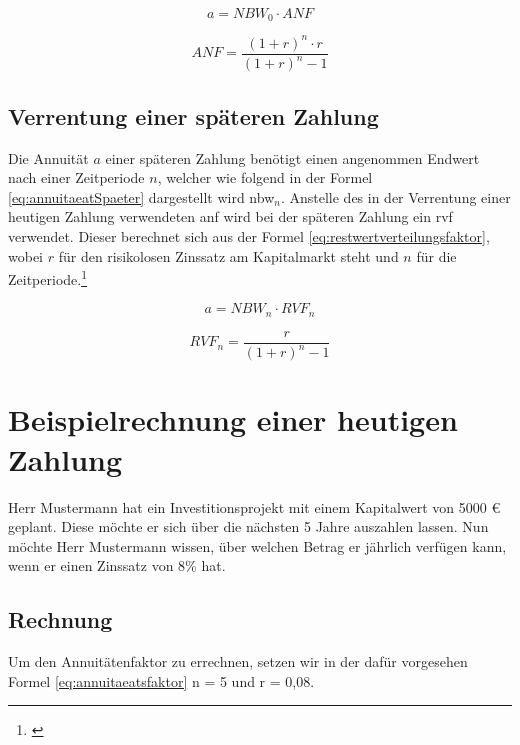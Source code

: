 \begin{equation}
    a = NBW_0 \cdot ANF
    \label{eq:annuitaeat}
\end{equation}

\begin{equation}
    ANF = \frac{ (1 + r)^n \cdot r }{ (1 + r)^n - 1 }
    \label{eq:annuitaeatsfaktor}
\end{equation}

\subsection{Verrentung einer späteren Zahlung}

Die Annuität $a$ einer späteren Zahlung benötigt einen angenommen Endwert nach einer Zeitperiode $n$, welcher wie folgend in der Formel \eqref{eq:annuitaeatSpaeter} dargestellt wird \ac{nbw}$_n$. Anstelle des in der Verrentung einer heutigen Zahlung verwendeten \ac{anf} wird bei der späteren Zahlung ein \ac{rvf} verwendet. Dieser berechnet sich aus der Formel \eqref{eq:restwertverteilungsfaktor}, wobei $r$ für den risikolosen Zinssatz am Kapitalmarkt steht und $n$ für die Zeitperiode.\footnote{\cite{rechnungswesen-annu}}

\begin{equation}
    a = NBW_n \cdot RVF_n
    \label{eq:annuitaeatSpaeter}
\end{equation}

\begin{equation}
    RVF_n = \frac{ r }{ (1 + r)^n - 1 }
    \label{eq:restwertverteilungsfaktor}
\end{equation}


\section{Beispielrechnung einer heutigen Zahlung}

Herr Mustermann hat ein Investitionsprojekt mit einem Kapitalwert von 5000 € geplant. Diese möchte er sich über die nächsten 5 Jahre auszahlen lassen. Nun möchte Herr Mustermann wissen, über welchen Betrag er jährlich verfügen kann, wenn er einen Zinssatz von 8\% hat.


\subsection{Rechnung}

Um den Annuitätenfaktor zu errechnen, setzen wir in der dafür vorgesehen Formel \eqref{eq:annuitaeatsfaktor} n = 5 und r = 0,08.

